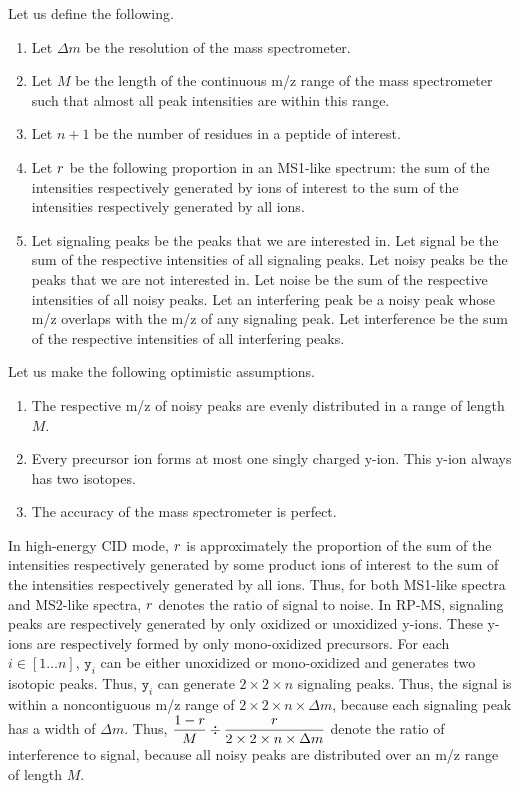 Let us define the following. 
\begin{enumerate}[nolistsep]
\item Let \({\Delta m}\) be the resolution of the mass spectrometer.
\item Let \(M\) be the length of the continuous \gls{m/z} range of the mass spectrometer such that almost all peak intensities are within this range.
\item Let \(n+1\) be the number of residues in a peptide of interest.
\item Let \(\mathnormal{r}\) be the following proportion in an \gls{MS1}-like spectrum: 
						the sum of the intensities respectively generated by ions of interest to the sum of the intensities respectively generated by all ions.
\item Let signaling peaks be the peaks that we are interested in.
      Let signal be the sum of the respective intensities of all signaling peaks.
      Let noisy peaks be the peaks that we are not interested in.
      Let noise be the sum of the respective intensities of all noisy peaks.
      Let an interfering peak be a noisy peak whose \gls{m/z} overlaps with the \gls{m/z} of any signaling peak.
      Let interference be the sum of the respective intensities of all interfering peaks.  
\end{enumerate}
Let us make the following optimistic assumptions.
\begin{enumerate}[nolistsep]
\item The respective \gls{m/z} of noisy peaks are evenly distributed in a range of length \(M\).
\item Every precursor ion forms at most one singly charged y-ion. This y-ion always has two isotopes.
\item The accuracy of the mass spectrometer is perfect.
\end{enumerate}
In high-energy \gls{CID} mode, \(\mathnormal{r}\) is approximately 
		the proportion of the sum of the intensities respectively generated by some product ions of interest 
		               to the sum of the intensities respectively generated by all ions.
Thus, for both \gls{MS1}-like spectra and \gls{MS2}-like spectra, \(\mathnormal{r}\) denotes the ratio of signal to noise.	
In \gls{RP-MS}, signaling peaks are respectively generated by only oxidized or unoxidized y-ions. 
These y-ions are respectively formed by only \gls{mono-oxidized} precursors.		
For each \(i{\in}[1{\dots}n]\), \(\texttt{y}_i\) can be either unoxidized or \gls{mono-oxidized} and generates two isotopic peaks.{}
Thus, \(\texttt{y}_i\) can generate \(2{\times}2{\times}n\) signaling peaks.
Thus, the signal is within a noncontiguous \gls{m/z} range of \(2{\times}2{\times}n{\times}\Delta{}m\),
	because each signaling peak has a width of \(\Delta{}m\).
Thus, \(\displaystyle \frac{1-\mathnormal{r}}{M} \div \frac{\mathnormal{r}}{2 \times 2 \times n \times \Delta{}m}\) 
		denote the ratio of interference to signal,
	because all noisy peaks are distributed over an \gls{m/z} range of length \(M\).

